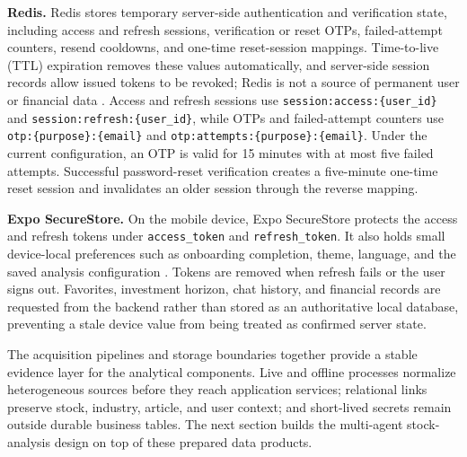 \textbf{Redis.} Redis stores temporary server-side authentication and verification state, including access and refresh sessions, verification or reset OTPs, failed-attempt counters, resend cooldowns, and one-time reset-session mappings. Time-to-live (TTL) expiration removes these values automatically, and server-side session records allow issued tokens to be revoked; Redis is not a source of permanent user or financial data \cite{redisDataTypes2026}. Access and refresh sessions use \texttt{session:access:\{user\_id\}} and \texttt{session:refresh:\{user\_id\}}, while OTPs and failed-attempt counters use \texttt{otp:\{purpose\}:\{email\}} and \texttt{otp:attempts:\{purpose\}:\{email\}}. Under the current configuration, an OTP is valid for 15 minutes with at most five failed attempts. Successful password-reset verification creates a five-minute one-time reset session and invalidates an older session through the reverse mapping.

\textbf{Expo SecureStore.} On the mobile device, Expo SecureStore protects the access and refresh tokens under \texttt{access\_token} and \texttt{refresh\_token}. It also holds small device-local preferences such as onboarding completion, theme, language, and the saved analysis configuration \cite{expoSecureStore2026}. Tokens are removed when refresh fails or the user signs out. Favorites, investment horizon, chat history, and financial records are requested from the backend rather than stored as an authoritative local database, preventing a stale device value from being treated as confirmed server state.

The acquisition pipelines and storage boundaries together provide a stable evidence layer for the analytical components. Live and offline processes normalize heterogeneous sources before they reach application services; relational links preserve stock, industry, article, and user context; and short-lived secrets remain outside durable business tables. The next section builds the multi-agent stock-analysis design on top of these prepared data products.
